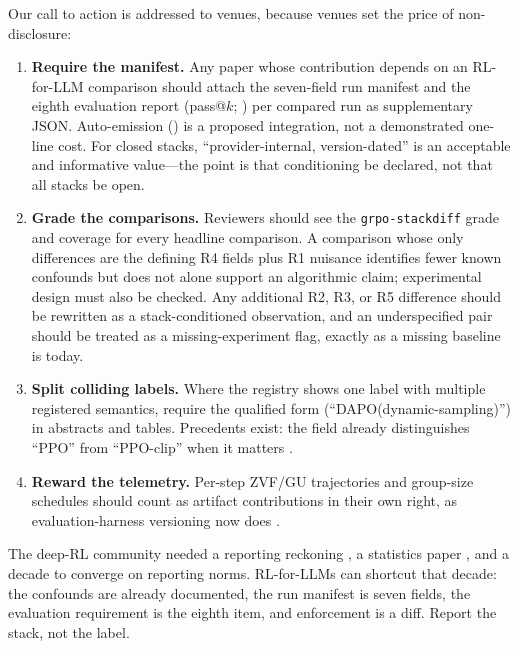 Our call to action is addressed to venues, because venues set the price of
non-disclosure:
\begin{enumerate}[leftmargin=1.5em, itemsep=2pt, topsep=2pt]
\item \textbf{Require the manifest.} Any paper whose contribution depends on
an RL-for-LLM comparison should attach the seven-field run manifest and the
eighth evaluation report (pass@$k$; ) per compared
run as supplementary JSON.
Auto-emission () is a proposed integration, not a
demonstrated one-line cost. For closed stacks, ``provider-internal, version-dated'' is an
acceptable and informative value---the point is that conditioning be
declared, not that all stacks be open.
\item \textbf{Grade the comparisons.} Reviewers should see the
\texttt{grpo-stackdiff} grade and coverage for every headline comparison.
A comparison whose only differences are the defining R4 fields plus R1
nuisance identifies fewer known confounds but does not alone support an
algorithmic claim; experimental design must also be checked. Any additional
R2, R3, or R5 difference should be rewritten as a stack-conditioned
observation, and an underspecified pair should be treated as a
missing-experiment flag, exactly as a missing baseline is today.
\item \textbf{Split colliding labels.} Where the registry shows one label
with multiple registered semantics, require the qualified form
(``DAPO(dynamic-sampling)'') in abstracts and tables. Precedents exist: the
field already distinguishes ``PPO'' from ``PPO-clip'' when it matters
\citep{schulman2017proximal, henderson2018deep}.
\item \textbf{Reward the telemetry.} Per-step ZVF/GU trajectories and
group-size schedules should count as artifact contributions in their own
right, as evaluation-harness versioning now does
\citep{biderman2024lessons, pineau2020improving}.
\end{enumerate}
The deep-RL community needed a reporting reckoning \citep{henderson2018deep}, a
statistics paper \citep{colas2019hitchhiker, agarwal2021deep}, and a decade
to converge on reporting norms. RL-for-LLMs can shortcut that decade: the
confounds are already documented, the run manifest is seven fields, the
evaluation requirement is the eighth item, and enforcement is a diff. Report
the stack, not the label.
